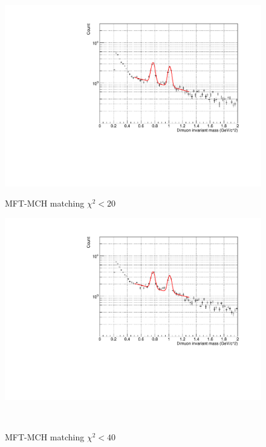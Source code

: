             \begin{figure}[H]
                \centering
                \begin{minipage}{0.45\textwidth}
                    \centering
                    \includegraphics[width=\textwidth]{fig/3_4_4_Fit_chi2_20.pdf}
                    \caption*{MFT-MCH matching $\chi^2 < 20$}
                \end{minipage}
                \hfill
                \begin{minipage}{0.45\textwidth}
                    \centering
                    \includegraphics[width=\textwidth]{fig/3_4_4_Fit_chi2_40.pdf}
                    \caption*{MFT-MCH matching $\chi^2 < 40$}
                \end{minipage}
                \\

\end{figure}
